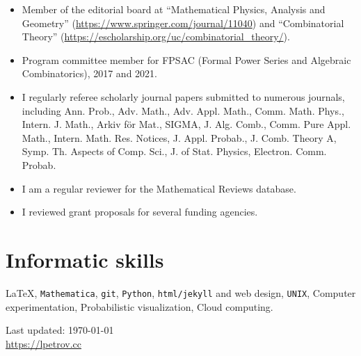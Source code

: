 \documentclass[letterpaper,11pt]{article}
\def\footerlink{https://lpetrov.cc}
\begin{document}
\begin{itemize}
	\item
	Member of the editorial board at ``Mathematical Physics, Analysis and Geometry'' (\url{https://www.springer.com/journal/11040}) and ``Combinatorial Theory'' (\url{https://escholarship.org/uc/combinatorial_theory/}).
	\item Program committee member for FPSAC (Formal Power Series and Algebraic Combinatorics),
		2017 and 2021.
	\item 
	I regularly referee scholarly journal papers submitted to numerous journals, 
	including
	Ann. Prob., Adv. Math., Adv. Appl. Math., Comm. Math. Phys., Intern. J. Math.,
	Arkiv f\"or Mat., SIGMA, J. Alg. Comb., Comm. Pure Appl. Math., Intern. Math.
	Res. Notices, J. Appl. Probab., J. Comb. Theory A, Symp. Th. Aspects of Comp.
	Sci., J. of Stat. Physics, Electron. Comm. Probab. 
	\item
	I am a regular
	reviewer for the Mathematical Reviews database. 
	\item
	I reviewed grant proposals for several funding agencies.
\end{itemize}

\section*{Informatic skills}

\LaTeX, \texttt{Mathematica}, 
\texttt{git}, \texttt{Python},
\texttt{html/jekyll} and web design, \texttt{UNIX},
Computer experimentation,
Probabilistic visualization, 
Cloud computing.

\bigskip

\begin{center}
	\begin{footnotesize}
		Last updated: \today \\ \href{\footerlink}{\url{\footerlink}}
	\end{footnotesize}
\end{center}
\end{document}
